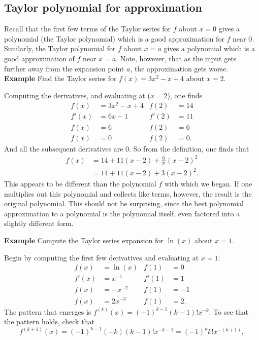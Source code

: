 \documentclass[twoside,openright,titlepage,a4paper]{book}
\begin{document}
\begin{sloppypar}
\subsection{Taylor polynomial for approximation}
Recall that the first few terms of the Taylor series for $f$ about $x=0$ gives a polynomial (the Taylor polynomial) which is a good approximation for $f$ near 0. Similarly, the Taylor polynomial for $f$ about $x=a$ gives a polynomial which is a good approximation of $f$ near $x=a$. Note, however, that as the input gets further away from the expansion point $a$, the approximation gets worse.
\textbf{Example} Find the Taylor series for $f(x) = 3x^2-x+4$ about $x=2$.
\begin{examplebox}
Computing the derivatives, and evaluating at ($x=2$), one finds
\begin{align*}
f(x) &= 3x^2-x+4 & f(2) &= 14 \\
f'(x) &= 6x-1 & f'(2) &= 11 \\
f(x) &= 6 & f(2) &= 6 \\
f(x) &= 0 & f(2) &= 0. 
\end{align*}
And all the subsequent derivatives are 0. So from the definition, one finds that
\begin{align*}
f(x) &= 14 + 11(x-2) + \frac{6}{2!}(x-2)^2 \\
&= 14 + 11(x-2) + 3(x-2)^2.
\end{align*}
This appears to be different than the polynomial $f$ with which we began. If one multiplies out this polynomial and collects like terms, however, the result is the original polynomial. This should not be surprising, since the best polynomial approximation to a polynomial is the polynomial itself, even factored into a slightly different form.
\end{examplebox}
\textbf{Example} Compute the Taylor series expansion for $\ln(x)$ about $x=1$. 
\begin{examplebox}
Begin by computing the first few derivatives and evaluating at $x=1$:
\begin{align*}
f(x) &= \ln(x) & f(1) &= 0 \\
f'(x) &= x^{-1} & f'(1) &=1 \\
f(x) &= -x^{-2} & f(1) &= -1 \\
f(x) &= 2x^{-3} & f(1) &= 2.
\end{align*}
The pattern that emerges is $f^{\left(k\right)}(x) = (-1)^{k-1}(k-1)!x^{-k}$. To see that the pattern holds, check that
\begin{equation*}
f^{\left(k+1\right)}(x) = (-1)^{k-1} (-k)(k-1)!x^{-k-1} = (-1)^k k! x^{-(k+1)},

\end{equation*}
\end{examplebox}
\end{sloppypar}
\end{document}
